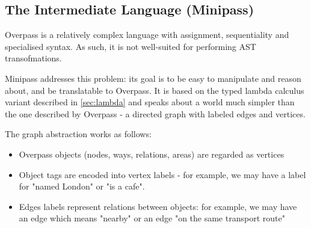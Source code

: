 \documentclass[main.tex]{subfiles}
\begin{document}
\subsection{The Intermediate Language (Minipass)}
\label{sec:minipass}
Overpass is a relatively complex language with assignment, sequentiality
and specialised syntax. As such, it is not well-suited for performing
AST transofmations.

Minipass addresses this problem: its goal is to be easy to manipulate
and reason about, and be translatable to Overpass. It is based on the typed
lambda calculus variant described in \cref{sec:lambda} and speaks about a
world much simpler than the one described by Overpass - a directed graph
with labeled edges and vertices.

The graph abstraction works as follows:
\begin{itemize}
    \item Overpass objects (nodes, ways, relations, areas) are regarded as
        vertices
    \item Object tags are encoded into vertex labels - for example, we
        may have a label for "named London" or "is a cafe".
    \item Edges labels represent relations between objects: for example,
        we may have an edge which means "nearby" or an edge "on the same
        transport route"
\end{itemize}

\end{document}
